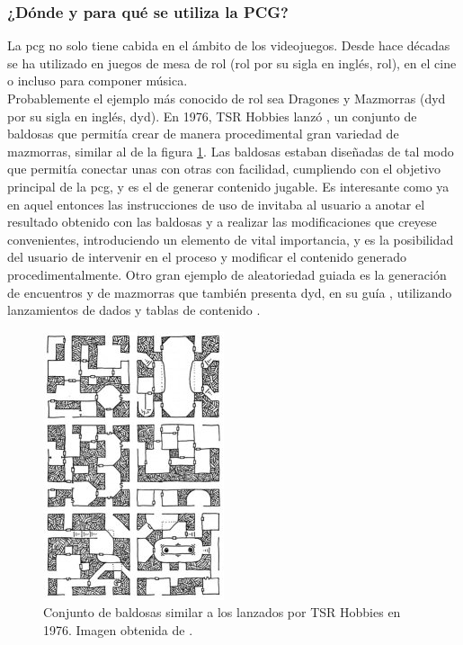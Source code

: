 \subsubsection{¿Dónde y para qué se utiliza la PCG?}

La \acrshort{pcg} no solo tiene cabida en el ámbito de los videojuegos. Desde hace décadas se ha utilizado en juegos de mesa de rol (\acrshort{rol} por su sigla en inglés, \acrlong{rol}), en el cine o incluso para componer música.\\

Probablemente el ejemplo más conocido de \acrshort{rol} sea Dragones y Mazmorras (\acrshort{dyd} por su sigla en inglés, \acrlong{dyd}). En 1976, TSR Hobbies lanzó , un conjunto de baldosas que permitía crear de manera procedimental gran variedad de mazmorras, similar al de la figura \ref{fig:dyd}. Las baldosas estaban diseñadas de tal modo que permitía conectar unas con otras con facilidad, cumpliendo con el objetivo principal de la \acrshort{pcg}, y es el de generar contenido jugable. Es interesante como ya en aquel entonces las instrucciones de uso de  invitaba al usuario a anotar el resultado obtenido con las baldosas y a realizar las modificaciones que creyese convenientes, introduciendo un elemento de vital importancia, y es la posibilidad del usuario de intervenir en el proceso y modificar el contenido generado procedimentalmente. Otro gran ejemplo de aleatoriedad guiada es la generación de encuentros y de mazmorras que también presenta \acrshort{dyd}, en su guía , utilizando lanzamientos de dados y tablas de contenido \cite{smith2015}.\\

\begin{figure}[H]
    \begin{center}
        \includegraphics[scale=3, angle =90 ]{img/dungeon_geo.jpg}
        \caption{Conjunto de baldosas similar a los lanzados por TSR Hobbies en 1976. Imagen obtenida de \cite{dungeonTiles}.}
        \label{fig:dyd}
    \end{center}
\end{figure}

